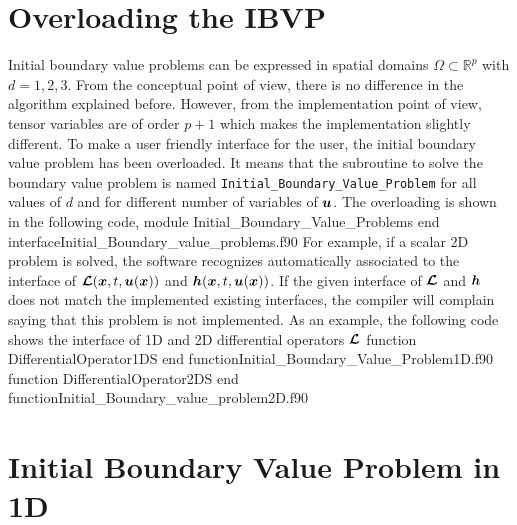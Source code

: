       
 
 \newpage         
 \section{Overloading the IBVP}
 Initial boundary value problems can be expressed in spatial domains   $\Omega \subset \mathbb{ R}^p$ with $ d=1, 2, 3 $. 
 From the conceptual point of view, there is no difference in the algorithm explained before. However, from the implementation point of view, 
 tensor variables are of order $p+1$ which makes the implementation slightly different. To make a user friendly interface for the user, the initial boundary value problem has been overloaded. It means that the subroutine to solve the boundary value problem is named \verb|Initial_Boundary_Value_Problem| for all values of $ d $ and for different number of variables of $ \boldsymbol{u} $.  
 The overloading is shown in the following code, 
  \vspace{0.2cm} 
        {module Initial_Boundary_Value_Problems}
        {end interface}{Initial_Boundary_value_problems.f90}
 For example, if a scalar 2D problem is solved, the software recognizes automatically associated to the interface  of $  \boldsymbol{\mathcal{L}} (\boldsymbol{x}, t, \boldsymbol{u}(\boldsymbol{x})) $ and $  \boldsymbol{h} (\boldsymbol{x},t, \boldsymbol{u}(\boldsymbol{x})) $. If the given interface of $ \boldsymbol{\mathcal{L}} $ and $ \boldsymbol{h}$ does not match the implemented existing interfaces, the compiler will complain saying that this problem is not implemented. 
 As an example, the following code shows the interface of 1D and 2D differential operators $ \boldsymbol{\mathcal{L}} $
  \vspace{0.2cm} 
        {function DifferentialOperator1DS}
        {end function}{Initial_Boundary_Value_Problem1D.f90}
        {function DifferentialOperator2DS}
        {end function}{Initial_Boundary_value_problem2D.f90}
 
    
   
       
     
\newpage 
\section{Initial Boundary Value Problem in 1D}
       
